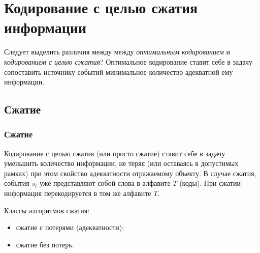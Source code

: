 \begin{frame}
\end{frame}


\section{Кодирование с целью сжатия информации}

Следует выделить различия между между \emph{оптимальным кодированием} и \emph{кодированием с целью сжатия}? Оптимальное кодирование ставит себе в задачу сопоставить источнику событий минимальное количество адекватной ему информации. 


\subsection{Сжатие}

\begin{frame}
    \frametitle{Сжатие}
    
    Кодирование с целью сжатия (или просто \alert{сжатие}) ставит себе в задачу уменьшить количество информации, не теряя (или оставаясь в допустимых рамках) при этом свойство адекватности отражаемому объекту. В случае сжатия, события $s_i$ уже представляют собой слова в алфавите $T$ (коды). При сжатии информация \alert{перекодируется} в том же алфавите $T$.
    
    Классы алгоритмов сжатия:
    \begin{itemize}
        \item сжатие с потерями (адекватности);
        \item сжатие без потерь.
    \end{itemize}
\end{frame}

